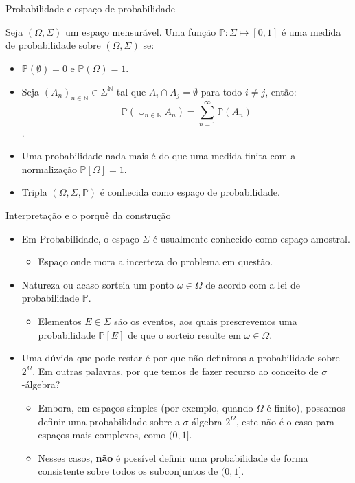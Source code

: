 \documentclass[11pt]{beamer}
\begin{document}
\begin{frame}{Probabilidade e espaço de probabilidade}
\begin{definition}
	Seja $(\Omega, \Sigma)$ um espaço mensurável. Uma função $\mathbb{P}: \Sigma \mapsto [0,1]$ é uma {medida de \color{red} probabilidade} sobre $(\Omega, \Sigma)$ se:
	\begin{itemize}
		\item $\mathbb{P}(\emptyset) = 0$ e {\color{red}$\mathbb{P}(\Omega)=1$}.
		\item Seja $(A_n)_{n \in \mathbb{N} }\in \Sigma^\mathbb{N}$ tal que $A_i \cap A_j = \emptyset$ para todo $i \neq j$, então:
		$$\mathbb{P}\left(\cup_{n \in \mathbb{N}} A_n\right) = \sum_{n=1}^\infty \mathbb{P}(A_n)$$.
	\end{itemize}
\end{definition}
\vspace{1em}
\begin{itemize}
	\item Uma probabilidade nada mais é do que uma medida finita com a normalização $\mathbb{P}[\Omega]=1$.
	\item Tripla $(\Omega, \Sigma, \mathbb{P})$ é conhecida como espaço de probabilidade. 
\end{itemize}
\end{frame}
\begin{frame}{Interpretação e o porquê da construção}
\begin{itemize}
	\item Em Probabilidade, o espaço $\Sigma$ é usualmente conhecido como {\color{blue}espaço amostral}.
	\begin{itemize}
		\item Espaço onde mora a incerteza do problema em questão.
	\end{itemize}
	\item Natureza ou acaso sorteia um ponto $\omega \in \Omega$ de acordo com a lei de probabilidade $\mathbb{P}$.
	\begin{itemize}
		\item Elementos $E\in \Sigma$ são os {\color{blue}eventos}, aos quais prescrevemos uma probabilidade $\mathbb{P}[E]$ de que o sorteio resulte em $\omega \in \Omega$.
	\end{itemize}
	\item Uma dúvida que pode restar é por que não definimos a probabilidade sobre $2^\Omega$. Em outras palavras, por que temos de fazer recurso ao conceito de $\sigma$-álgebra?
	\begin{itemize}
		\item Embora, em espaços simples (por exemplo, quando $\Omega$ é finito), possamos definir uma probabilidade sobre a $\sigma$-álgebra $2^\Omega$, este não é o caso para espaços mais complexos, como $(0,1]$.
		\item Nesses casos, \textbf{não} é possível definir uma probabilidade de forma consistente sobre todos os subconjuntos de $(0,1]$.

	\end{itemize}
\end{itemize}
\end{frame}
\end{document}
